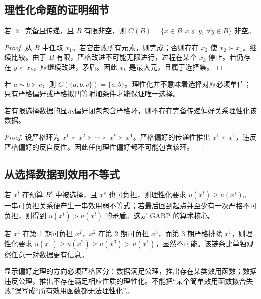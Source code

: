 \subsection{理性化命题的证明细节}

\begin{proposition}[理性化与最大元]
若 $\succeq$ 完备且传递，且 $B$ 有限非空，则
$C(B)=\{x\in B:x\succeq y,\ \forall y\in B\}$ 非空。
\end{proposition}
\begin{proof}
从 $B$ 中任取 $x_1$。若它击败所有元素，则完成；否则存在 $x_2$ 使 $x_2\succ x_1$。继续比较。由于 $B$ 有限，严格改进不可能无限进行，过程在某个 $x_k$ 停止。若仍存在 $y\succ x_k$，应继续改进，矛盾。因此 $x_k$ 是最大元，且属于选择集。
\end{proof}

\begin{example}[并列最大元]
若 $a\sim b\succ c$，则 $C(\{a,b,c\})=\{a,b\}$。理性化并不意味着选择对应必须单值；只有严格偏好或严格拟凹等附加条件才能保证唯一选择。
\end{example}

\begin{proposition}[严格偏好环排除理性化]
若有限选择数据的显示偏好闭包包含严格环，则不存在完备传递偏好关系理性化该数据。
\end{proposition}
\begin{proof}
设严格环为 $x^1\succ x^2\succ\cdots\succ x^k\succ x^1$。严格偏好的传递性推出 $x^1\succ x^1$，违反严格偏好的反自反性。因此任何理性偏好都不可能包含该环。
\end{proof}

\subsection{从选择数据到效用不等式}
若 $x^t$ 在预算 $B^t$ 中被选择，且 $x^s$ 也可负担，则理性化要求 $u(x^t)\ge u(x^s)$。一串可负担关系便产生一串效用弱不等式；若最后回到起点并至少有一次严格不可负担，则得到 $u(x^t)>u(x^t)$ 的矛盾。这是 GARP 的算术核心。

\begin{example}[一条三期不等式链]
若 $x^1$ 在第 1 期可负担 $x^2$，$x^2$ 在第 2 期可负担 $x^3$，而第 3 期严格排除 $x^1$，则理性化要求
$u(x^1)\ge u(x^2)\ge u(x^3)>u(x^1)$，显然不可能。该链条比单独观察任意一对数据更有信息。
\end{example}

\begin{remark}
显示偏好定理的方向必须严格区分：数据满足公理，推出存在某类效用函数；数据违反公理，推出不存在满足相应性质的理性化。不能把“某个简单效用函数拟合失败”误写成“所有效用函数都无法理性化”。
\end{remark}

